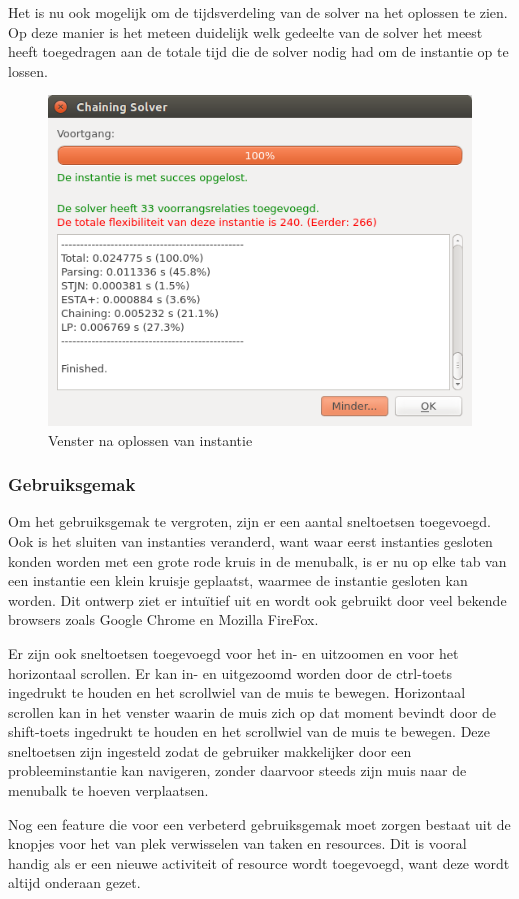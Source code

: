 Het is nu ook mogelijk om de tijdsverdeling van de solver na het oplossen te zien. Op deze manier is het meteen duidelijk welk gedeelte van de solver het meest heeft toegedragen aan de totale tijd die de solver nodig had om de instantie op te lossen.

\begin{figure}[H]
    \center
    \includegraphics[width=.7\textwidth]{../images/solver-dialog.png}
    \caption{Venster na oplossen van instantie}
    \label{fig:solver-dialog}
\end{figure}

\subsubsection{Gebruiksgemak}
Om het gebruiksgemak te vergroten, zijn er een aantal sneltoetsen toegevoegd. Ook is het sluiten van instanties veranderd, want waar eerst instanties gesloten konden worden met een grote rode kruis in de menubalk, is er nu op elke tab van een instantie een klein kruisje geplaatst, waarmee de instantie gesloten kan worden. Dit ontwerp ziet er intu\"itief uit en wordt ook gebruikt door veel bekende browsers zoals Google Chrome en Mozilla FireFox.

Er zijn ook sneltoetsen toegevoegd voor het in- en uitzoomen en voor het horizontaal scrollen. Er kan in- en uitgezoomd worden door de ctrl-toets ingedrukt te houden en het scrollwiel van de muis  te bewegen. Horizontaal scrollen kan in het venster waarin de muis zich op dat moment bevindt door de shift-toets ingedrukt te houden en het scrollwiel van de muis te bewegen. Deze sneltoetsen zijn ingesteld zodat de gebruiker makkelijker door een probleeminstantie kan navigeren, zonder daarvoor steeds zijn muis naar de menubalk te hoeven verplaatsen.

Nog een feature die voor een verbeterd gebruiksgemak moet zorgen bestaat uit de knopjes voor het van plek verwisselen van taken en resources. Dit is vooral handig als er een nieuwe activiteit of resource wordt toegevoegd, want deze wordt altijd onderaan gezet. 

